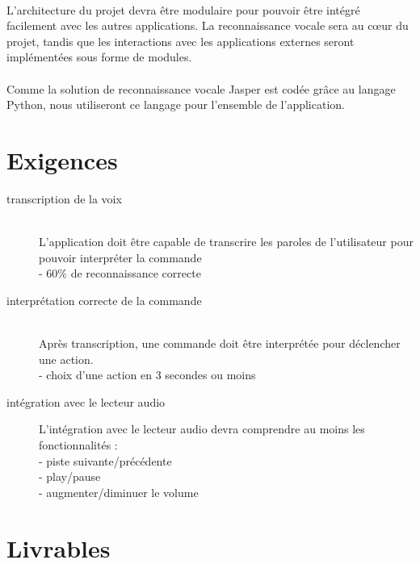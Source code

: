 \documentclass[12pt]{article}
\begin{document}
\paragraph{}
L'architecture du projet devra être modulaire pour pouvoir être intégré
facilement avec les autres applications. La reconnaissance vocale sera au
cœur du projet, tandis que les interactions avec les applications externes
seront implémentées sous forme de modules.

\paragraph{}
Comme la solution de reconnaissance vocale Jasper est codée grâce au langage
Python, nous utiliseront ce langage pour l'ensemble de l'application.

    \section{Exigences}

    \begin{description}
        \item[transcription de la voix] \hfill \\
        L'application doit être capable de transcrire
        les paroles de l'utilisateur pour pouvoir interpréter la
        commande \\
        - 60\% de reconnaissance correcte

        \item[interprétation correcte de la commande] \hfill \\
        Après transcription, une
        commande doit être interprétée pour déclencher une action. \\
        - choix d'une action en 3 secondes ou moins 

        \item[intégration avec le lecteur audio]
        L'intégration avec le lecteur audio devra comprendre au moins les fonctionnalités : \\
        - piste suivante/précédente \\
        - play/pause \\
        - augmenter/diminuer le volume \\

    \end{description}

    \section{Livrables}
\end{document}
